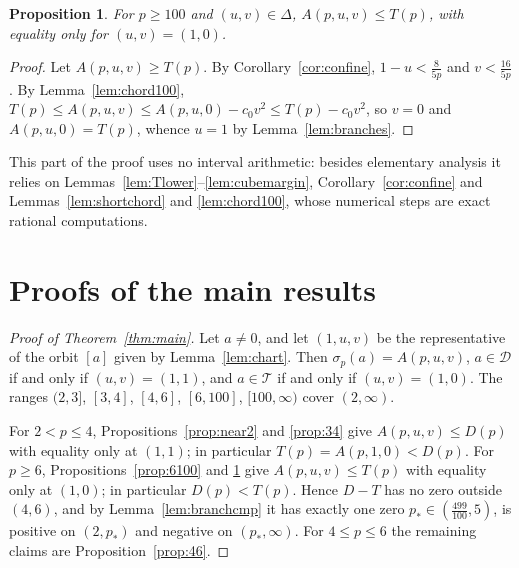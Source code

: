 \documentclass[11pt]{amsart}
\newtheorem{proposition}[theorem]{Proposition}
\theoremstyle{definition}
\theoremstyle{remark}
\numberwithin{equation}{section}
\newcommand{\cD}{\mathcal{D}}
\newcommand{\cT}{\mathcal{T}}
\begin{document}
\begin{proposition}\label{prop:tail}
For $p\ge100$ and $(u,v)\in\Delta$, $A(p,u,v)\le T(p)$, with equality only for $(u,v)=(1,0)$.
\end{proposition}

\begin{proof}
Let $A(p,u,v)\ge T(p)$. By Corollary~\ref{cor:confine}, $1-u<\frac8{5p}$ and $v<\frac{16}{5p}$. By Lemma~\ref{lem:chord100}, $T(p)\le A(p,u,v)\le A(p,u,0)-c_0v^2\le T(p)-c_0v^2$, so $v=0$ and $A(p,u,0)=T(p)$, whence $u=1$ by Lemma~\ref{lem:branches}.
\end{proof}

This part of the proof uses no interval arithmetic: besides elementary analysis it relies on Lemmas~\ref{lem:Tlower}--\ref{lem:cubemargin}, Corollary~\ref{cor:confine} and Lemmas~\ref{lem:shortchord} and \ref{lem:chord100}, whose numerical steps are exact rational computations.

\section{Proofs of the main results}\label{sec:proofs}

\begin{proof}[Proof of Theorem~\ref{thm:main}]
Let $a\ne0$, and let $(1,u,v)$ be the representative of the orbit $[a]$ given by Lemma~\ref{lem:chart}. Then $\sigma_p(a)=A(p,u,v)$, $a\in\cD$ if and only if $(u,v)=(1,1)$, and $a\in\cT$ if and only if $(u,v)=(1,0)$. The ranges $(2,3]$, $[3,4]$, $[4,6]$, $[6,100]$, $[100,\infty)$ cover $(2,\infty)$.

For $2<p\le4$, Propositions~\ref{prop:near2} and \ref{prop:34} give $A(p,u,v)\le D(p)$ with equality only at $(1,1)$; in particular $T(p)=A(p,1,0)<D(p)$. For $p\ge6$, Propositions~\ref{prop:6100} and \ref{prop:tail} give $A(p,u,v)\le T(p)$ with equality only at $(1,0)$; in particular $D(p)<T(p)$. Hence $D-T$ has no zero outside $(4,6)$, and by Lemma~\ref{lem:branchcmp} it has exactly one zero $p_*\in(\frac{499}{100},5)$, is positive on $(2,p_*)$ and negative on $(p_*,\infty)$. For $4\le p\le6$ the remaining claims are Proposition~\ref{prop:46}.
\end{proof}
\end{document}
